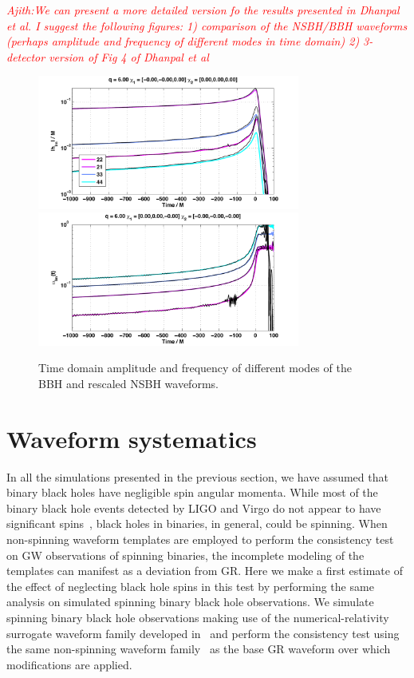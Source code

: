 \documentclass[prd,preprintnumbers,twocolumn,eqsecnum,floatfix,a4paper,nofootinbib,superscriptaddress]{revtex4}
\newcommand{\ajith}[1]{\textcolor{red}{\textit{Ajith:#1}}}
\begin{document}
\ajith{We can present a more detailed version fo the results presented in Dhanpal et al. I suggest the following figures: 1) comparison of the NSBH/BBH waveforms (perhaps amplitude and frequency of different modes in time domain) 2) 3-detector version of Fig 4 of Dhanpal et al}

\begin{figure}[htb] 
\begin{center}
\includegraphics[width=3.4in]{figs/BBH_NSBH_q6_amp.pdf}
\includegraphics[width=3.4in]{figs/BBH_NSBH_q6_freq.pdf}
\label{fig:bbh_nsbh_waveforms}
\end{center} 
\caption{Time domain amplitude and frequency of different modes of the BBH and rescaled NSBH waveforms.}
\end{figure}



\section{Waveform systematics}

In all the simulations presented in the previous section, we have assumed that binary black holes have negligible spin angular momenta. While most of the binary black hole events detected by LIGO and Virgo do not appear to have significant spins~\cite{GWTC1}, black holes in binaries, in general, could be spinning. When non-spinning waveform templates are employed to perform the consistency test on GW observations of spinning binaries, the incomplete modeling of the templates can manifest as a deviation from GR. Here we make a first estimate of the effect of neglecting black hole spins in this test by performing the same analysis on simulated spinning binary black hole observations. We simulate spinning binary black hole observations making use of the numerical-relativity surrogate waveform family developed in~\cite{Varma2019} and perform the consistency test using the same non-spinning waveform family~\cite{Mehta} as the base GR waveform over which modifications are applied. 
\end{document}
